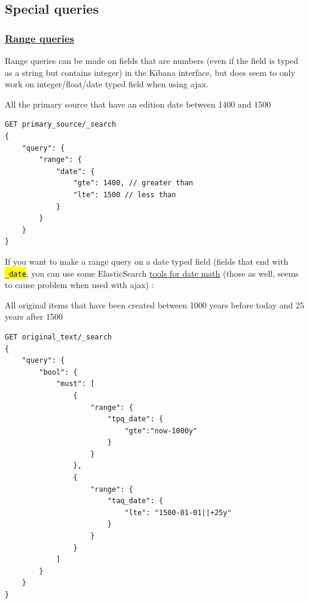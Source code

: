 \documentclass[a4paper,12pt,twoside]{book}
\let\OldTexttt\texttt
\renewcommand{\texttt}[1]{\OldTexttt{\hl{#1}}}
\let\quoteOld\quote
\let\endquoteOld\endquote
\renewenvironment{quote}{\small\quoteOld}{\endquoteOld}
\begin{document}
		\subsection{Special queries}\label{special-queries}

			\subsubsection{\href{https://www.elastic.co/guide/en/elasticsearch/reference/current/query-dsl-range-query.html}{Range queries}}\label{range-queries}

Range queries can be made on fields that are numbers (even if the field is typed as a string but contains integer) in the Kibana interface, but does seem to only work on integer/float/date typed field when using ajax.

\begin{quote}
	All the primary source that have an edition date between 1400 and 1500
\end{quote}

\begin{lstlisting}
GET primary_source/_search
{
    "query": {
        "range": {
            "date": {
                "gte": 1400, // greater than
                "lte": 1500 // less than
            }
        }
    }
}
\end{lstlisting}

If you want to make a range query on a date typed field (fields that end with \texttt{\_date}, you can use some ElasticSearch \href{https://www.elastic.co/guide/en/elasticsearch/reference/current/common-options.html\#date-math}{tools for date math} (those as well, seems to cause problem when used with ajax) :

\begin{quote}
	All original items that have been created between 1000 years before today and 25 years after 1500
\end{quote}

\begin{lstlisting}
GET original_text/_search
{
    "query": {
        "bool": {
            "must": [
                {
                    "range": {
                        "tpq_date": {
                            "gte":"now-1000y"
                        }
                    }
                },
                {
                    "range": {
                        "taq_date": {
                            "lte": "1500-01-01||+25y"
                        }
                    }
                }
            ]
        }
    }
}
\end{lstlisting}
\end{document}
